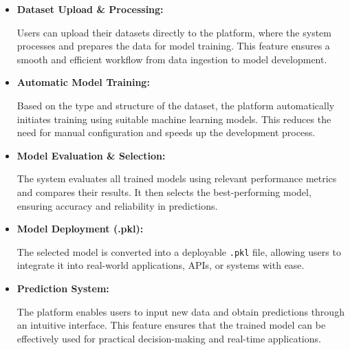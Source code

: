\begin{itemize}
\item \textbf{Dataset Upload \& Processing:}

Users can upload their datasets directly to the platform, where the system processes and prepares the data for model training. This feature ensures a smooth and efficient workflow from data ingestion to model development.\\

\item \textbf{Automatic Model Training:}

Based on the type and structure of the dataset, the platform automatically initiates training using suitable machine learning models. This reduces the need for manual configuration and speeds up the development process.\\

\item \textbf{Model Evaluation \& Selection:}

The system evaluates all trained models using relevant performance metrics and compares their results. It then selects the best-performing model, ensuring accuracy and reliability in predictions.\\

\item \textbf{Model Deployment (.pkl):}

The selected model is converted into a deployable \texttt{.pkl} file, allowing users to integrate it into real-world applications, APIs, or systems with ease.\\

\item \textbf{Prediction System:}

The platform enables users to input new data and obtain predictions through an intuitive interface. This feature ensures that the trained model can be effectively used for practical decision-making and real-time applications.\\


\end{itemize}

\vspace{10 cm} 

